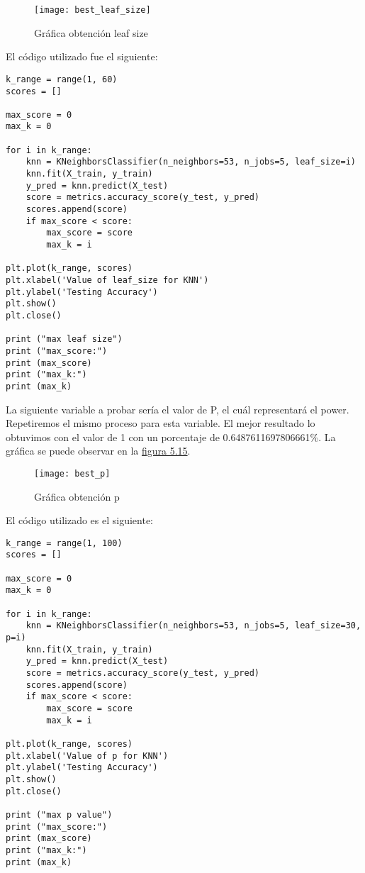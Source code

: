 \begin{figure}[htb]
	\centering
	\texttt{[image: best\_leaf\_size]}
	\caption[Gráfica obtención leaf size]{Gráfica obtención leaf size}
	\label{fig:Gráfica obtención leaf size}
\end{figure}

El código utilizado fue el siguiente:

\begin{lstlisting}
k_range = range(1, 60)
scores = []

max_score = 0
max_k = 0

for i in k_range:
    knn = KNeighborsClassifier(n_neighbors=53, n_jobs=5, leaf_size=i)
    knn.fit(X_train, y_train)
    y_pred = knn.predict(X_test)
    score = metrics.accuracy_score(y_test, y_pred)
    scores.append(score)
    if max_score < score:
        max_score = score
        max_k = i

plt.plot(k_range, scores)
plt.xlabel('Value of leaf_size for KNN')
plt.ylabel('Testing Accuracy')
plt.show()
plt.close()

print ("max leaf size")
print ("max_score:")
print (max_score)
print ("max_k:")
print (max_k)
\end{lstlisting}



La siguiente variable a probar sería el valor de P, el cuál representará el power.
Repetiremos el mismo proceso para esta variable. El mejor resultado lo obtuvimos con
el valor de 1 con un porcentaje de 0.6487611697806661\%. La gráfica se puede observar
en la \hyperref[fig:Gráfica obtención p]{figura 5.15}.

\begin{figure}[htb]
	\centering
	\texttt{[image: best\_p]}
	\caption[Gráfica obtención p]{Gráfica obtención p}
	\label{fig:Gráfica obtención p}
\end{figure}


El código utilizado es el siguiente:
\begin{lstlisting}
k_range = range(1, 100)
scores = []

max_score = 0
max_k = 0

for i in k_range:
    knn = KNeighborsClassifier(n_neighbors=53, n_jobs=5, leaf_size=30, p=i)
    knn.fit(X_train, y_train)
    y_pred = knn.predict(X_test)
    score = metrics.accuracy_score(y_test, y_pred)
    scores.append(score)
    if max_score < score:
        max_score = score
        max_k = i

plt.plot(k_range, scores)
plt.xlabel('Value of p for KNN')
plt.ylabel('Testing Accuracy')
plt.show()
plt.close()

print ("max p value")
print ("max_score:")
print (max_score)
print ("max_k:")
print (max_k)
\end{lstlisting}


